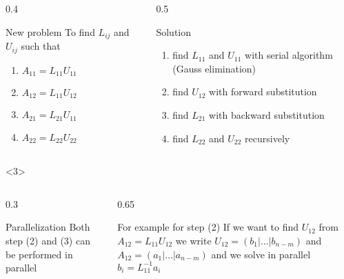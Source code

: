 \documentclass[10pt]{beamer}
\theoremstyle{definition}
\begin{document}
\begin{frame}
\begin{columns}
\begin{column}{0.4\framewidth}
\begin{block}{New problem}
To find $L_{ij}$ and $U_{ij}$ such that
\begin{enumerate}
\item $A_{11}=L_{11}U_{11}$
\item $A_{12}=L_{11}U_{12}$
\item $A_{21}=L_{21}U_{11}$
\item $A_{22}=L_{22}U_{22}$
\end{enumerate}
\end{block}
\end{column}
\begin{column}{0.5\framewidth}
\begin{block}{Solution}
\begin{enumerate}
\item find $L_{11}$ and $U_{11}$ with serial algorithm (Gauss elimination)
\item find $U_{12}$ with forward substitution
\item find $L_{21}$ with backward substitution
\item find $L_{22}$ and $U_{22}$ recursively
\end{enumerate}
\end{block}
\end{column}
\end{columns}

\begin{onlyenv}<3>
\begin{columns}

\begin{column}{0.3\framewidth}
\begin{block}{Parallelization}
Both step (2) and (3) can be performed in parallel
\end{block}
\end{column}

\begin{column}{0.65\framewidth}
\begin{block}{For example for step (2)}
If we want to find $U_{12}$ from $A_{12}=L_{11}U_{12}$ we write $U_{12}=(b_1|\dots|b_{n-m})$ and $A_{12}=(a_1|\dots|a_{n-m})$ and we solve in parallel $b_i=L_{11}^{-1}a_i$ 
\end{block}
\end{column}
\end{columns}
\end{onlyenv}

\end{frame}
\end{document}
